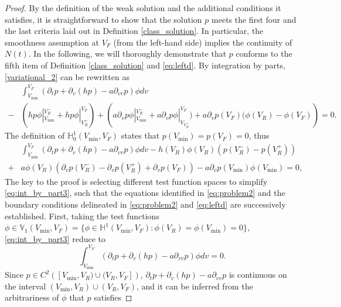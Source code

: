 \begin{proof}
By the definition of the weak solution and the additional conditions it satisfies, it is straightforward to show that the solution $p$ meets the first four and the last criteria laid out in Definition \ref{class_solution}. In particular, the smoothness assumption at $V_F$ (from the left-hand side) implies the continuity of $N(t)$.  In the following, we will thoroughly demonstrate that $p$ conforms to the fifth item of Definition \ref{class_solution} and \eqref{eq:leftd}. By integration by parts, \eqref{variational_2} can be rewritten as 
\begin{equation}
\label{eq:int_by_part2}
\begin{aligned}
    &\int_{V_{\min}}^{V_{F}} \left(\partial_{t}p+\partial_{v}(hp)-a\partial_{v v}p\right)\phi dv\\ 
    -&\left(hp\phi|_{V_{\min}}^{V_R^-}+hp\phi|_{V_R^+}^{V_F}\right)+\left(a\partial_vp\phi|_{V_{\min}}^{V_R^-}+a\partial_vp\phi|_{V_{V_R^+}}^{V_F})+a\partial_vp(V_F)(\phi(V_R)-\phi(V_F)\right)=0.
\end{aligned}
\end{equation}
The definition of $\mathbb{H}^{1}_0(V_{\min},V_F)$ states that $p(V_{\min})=p(V_F)=0$, thus
\begin{equation}
    \label{eq:int_by_part3}
    \begin{aligned}
        &\int_{V_{\min}}^{V_{F}} \left(\partial_{t}p+\partial_{v}(hp)-a\partial_{v v}p\right)\phi dv-h(V_R)\phi(V_R)\left(p(V_R^-)-p(V_R^+)\right)\\
        +&a\phi(V_R)\left(\partial_vp(V_R^-)-\partial_vp(V_R^+)+\partial_vp(V_F)\right)-a\partial_vp(V_{\min})\phi(V_{\min})=0,
    \end{aligned}
\end{equation}
The key to the proof is selecting different test function spaces to simplify \eqref{eq:int_by_part3}, such that the equations identified in \eqref{eq:problem2} and the boundary conditions delineated in \eqref{eq:problem2} and \eqref{eq:leftd} are successively established. First, taking the test functions $\phi \in \mathbb{V}_1(V_{\min},V_F)=\{\phi \in \mathbb{H}^1(V_{\min},V_F): \phi(V_R)=\phi(V_{\min})=0\}$, \eqref{eq:int_by_part3} reduce to
\begin{equation}
    \int_{V_{\min}}^{V_{F}} \left(\partial_{t}p+\partial_{v}(hp)-a\partial_{v v}p\right)\phi dv=0.
\end{equation}
 Since $p\in C^{2}\left([V_{\min},V_R)\cup(V_R,V_F]\right)$, $\partial_{t}p+\partial_{v}(hp)-a\partial_{v v}p$ is continuous on the interval $(V_{\min},V_R)\cup(V_R,V_F)$, and it can be inferred from the arbitrariness of $\phi$ that $p$ satisfies

\end{proof}
